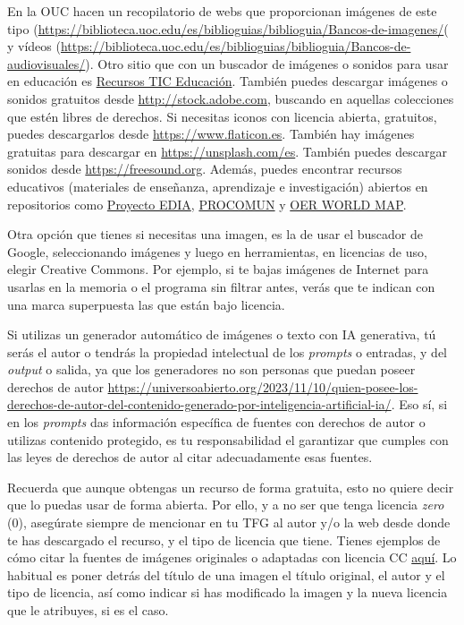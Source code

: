 En la OUC hacen un recopilatorio de webs que proporcionan imágenes de este tipo (\url{https://biblioteca.uoc.edu/es/biblioguias/biblioguia/Bancos-de-imagenes/}( y vídeos (\url{https://biblioteca.uoc.edu/es/biblioguias/biblioguia/Bancos-de-audiovisuales/}). Otro sitio que con un buscador de imágenes o sonidos para usar en educación es \href{http://recursostic.educacion.es}{Recursos TIC Educación}. También puedes descargar imágenes o sonidos gratuitos desde \url{http://stock.adobe.com}, buscando en aquellas colecciones que estén libres de derechos. Si necesitas iconos con licencia abierta, gratuitos, puedes descargarlos desde \url{https://www.flaticon.es}. También hay imágenes gratuitas para descargar en \url{https://unsplash.com/es}.
También puedes descargar sonidos desde \url{https://freesound.org}. Además, puedes encontrar recursos educativos  (materiales de enseñanza, aprendizaje e investigación) abiertos en repositorios como \href{cedec.intef.es}{Proyecto EDIA}, \href{procomun.educalab.es}{PROCOMUN} y \href{oerworldmap.org}{OER WORLD MAP}. 

Otra opción que tienes si necesitas una imagen, es la de usar el buscador de Google, seleccionando imágenes y luego en herramientas, en licencias de uso, elegir Creative Commons. Por ejemplo, si te bajas imágenes de Internet para usarlas en la memoria o el programa sin filtrar antes, verás que te indican con una marca superpuesta las que están bajo licencia. 


Si utilizas un generador automático de imágenes o texto con IA generativa, tú serás el autor o tendrás la propiedad intelectual de los \textit{prompts} o entradas, y del \textit{output} o salida, ya que los generadores no son personas que puedan poseer derechos de autor \url{https://universoabierto.org/2023/11/10/quien-posee-los-derechos-de-autor-del-contenido-generado-por-inteligencia-artificial-ia/}. Eso sí, si en los \textit{prompts} das información específica de fuentes con derechos de autor o utilizas contenido protegido, es tu responsabilidad el garantizar que cumples con las leyes de derechos de autor al citar adecuadamente esas fuentes.

Recuerda que aunque obtengas un recurso de forma gratuita, esto no quiere decir que lo puedas usar de forma abierta. Por ello, y a no ser que tenga licencia \textit{zero} (0), asegúrate siempre de mencionar en tu TFG al autor y/o la web desde donde te has descargado el recurso, y el tipo de licencia que tiene. Tienes ejemplos de cómo citar la fuentes de imágenes originales o adaptadas con licencia CC \href{https://wiki.creativecommons.org/wiki/Recommended_practices_for_attribution}{aquí}. Lo habitual es poner detrás del título de una imagen el título original, el autor y el tipo de licencia, así como indicar si has modificado la imagen y la nueva licencia que le atribuyes, si es el caso.


